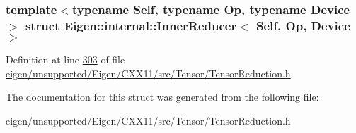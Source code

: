 \subsubsection*{template$<$typename Self, typename Op, typename Device$>$\newline
struct Eigen\+::internal\+::\+Inner\+Reducer$<$ Self, Op, Device $>$}



Definition at line \hyperlink{eigen_2unsupported_2_eigen_2_c_x_x11_2src_2_tensor_2_tensor_reduction_8h_source_l00303}{303} of file \hyperlink{eigen_2unsupported_2_eigen_2_c_x_x11_2src_2_tensor_2_tensor_reduction_8h_source}{eigen/unsupported/\+Eigen/\+C\+X\+X11/src/\+Tensor/\+Tensor\+Reduction.\+h}.



The documentation for this struct was generated from the following file\+:\begin{DoxyCompactItemize}
\item 
eigen/unsupported/\+Eigen/\+C\+X\+X11/src/\+Tensor/\+Tensor\+Reduction.\+h\end{DoxyCompactItemize}
